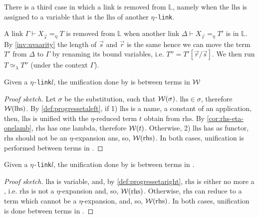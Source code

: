 \documentclass[sigconf,natbib=false,review]{acmart}
\newcommand{\UnifRel}{\ensuremath{\simeq}}
\newcommand{\Ue}{\ensuremath{\UnifRel_\lambda}\xspace}
\newcommand{\linkMacro}[1]{\ensuremath{#1}\texttt{-link}\xspace}
\newcommand{\linketa} {\linkMacro{\eta}}
\newcommand{\linketaM}[3]{\ensuremath{#1 \vdash #2 =_\eta #3}}
\newcommand{\lhs}{\ensuremath{\mathrm{lhs}}\xspace}
\newcommand{\rhs}{\ensuremath{\mathrm{rhs}}\xspace}
\newcommand{\linkStore}{\ensuremath{\mathbb{L}}\xspace}
\begin{document}
There is a third case in which a link is removed from \linkStore, namely
when the \lhs is assigned to a variable that is the \lhs of another
\linketa.

\newcommand{\progressetadedup}{\emph{progress-$\eta$-deduplicate}}
\begin{definition}[\progressetadedup]\label{def:progressetadedup}
  A link \linketaM{\Gamma}{X_{\vec{s}}}{T} is removed from \linkStore when
  another link \linketaM{\Delta}{X_{\vec{r}}}{T'} is in  \linkStore.
  By \cref{inv:uvaarity} the length of $\vec{s}$ and $\vec{r}$ is the same
  hence we can move the term $T'$ from $\Delta$ to $\Gamma$ by renaming its
  bound variables, i.e. $T'' = T'[\vec{r}/\vec{s}]$.
  We then run $T \Ue{} T''$ (under the context $\Gamma$).
\end{definition}

\begin{lemma}
  Given a \linketa $l$, the unification done by \progressetaleft is between
  terms in $\mathcal{W}$  
  \label{lemma:unif-eta-1}
\end{lemma}

\begin{proof}[Proof sketch]
  Let $\sigma$ be the substitution, such that $\mathcal{W}(\sigma)$. $\lhs \in
  \sigma$, therefore $\wellb(\lhs)$. By \cref{def:progressetaleft}, if 1) \lhs is
  a name, a constant of an application, then, \lhs is unified with the
  $\eta$-reduced term $t$ obtain from \rhs. By \cref{cor:rhs-eta-onelamb}, \rhs
  has one lambda, therefore $\mathcal{W}(t)$. Otherwise, 2) \lhs has  as
  functor, \rhs should not be an $\eta$-expansion ans, so, $\wellb(\rhs)$. In
  both cases, unification is performed between terms in \wellb.
\end{proof}

\begin{lemma}
  Given a \linketa $l$, the unification done by \progressetaright is between
  terms in \wellb.
  \label{lemma:unif-eta-2}
\end{lemma}

\begin{proof}[Proof sketch]
  \lhs is variable, and, by \cref{def:progressetaright}, \rhs is either no more
  a \maybeeta, i.e. \rhs is not a $\eta$-expansion and, so, $\wellb(\rhs)$.
  Otherwise, \rhs can reduce to a term which cannot be a $\eta$-expansion, and,
  so, $\wellb(\rhs)$. In both cases, unification is done between terms in
  \wellb.
\end{proof}
\end{document}
